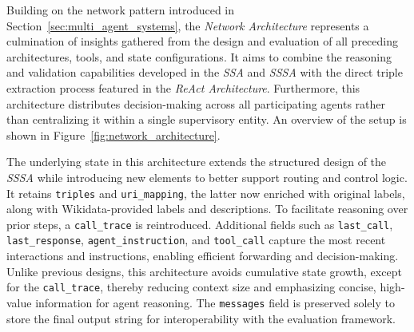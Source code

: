 \documentclass[a4paper,oneside,bibliography=totoc]{scrbook}
\begin{document}
Building on the network pattern introduced in Section~\ref{sec:multi_agent_systems}, the \textit{Network Architecture} represents a culmination of insights gathered from the design and evaluation of all preceding architectures, tools, and state configurations. It aims to combine the reasoning and validation capabilities developed in the \textit{\ac{SSA}} and \textit{\ac{SSSA}} with the direct triple extraction process featured in the \textit{ReAct Architecture}. Furthermore, this architecture distributes decision-making across all participating agents rather than centralizing it within a single supervisory entity. An overview of the setup is shown in Figure~\ref{fig:network_architecture}.

The underlying state in this architecture extends the structured design of the \textit{\ac{SSSA}} while introducing new elements to better support routing and control logic. It retains \texttt{triples} and \texttt{uri\_mapping}, the latter now enriched with original labels, along with Wikidata-provided labels and descriptions. To facilitate reasoning over prior steps, a \texttt{call\_trace} is reintroduced. Additional fields such as \texttt{last\_call}, \texttt{last\_response}, \texttt{agent\_instruction}, and \texttt{tool\_call} capture the most recent interactions and instructions, enabling efficient forwarding and decision-making. Unlike previous designs, this architecture avoids cumulative state growth, except for the \texttt{call\_trace}, thereby reducing context size and emphasizing concise, high-value information for agent reasoning. The \texttt{messages} field is preserved solely to store the final output string for interoperability with the evaluation framework.
\end{document}
